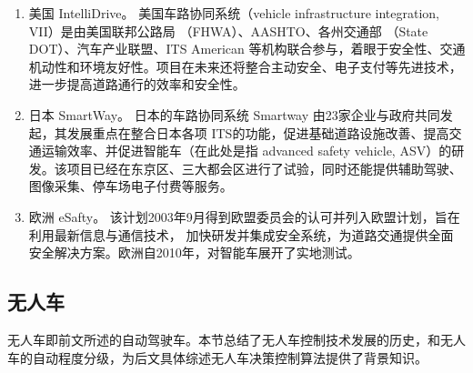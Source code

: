 \begin{enumerate}[wide=\parindent,label=(\arabic*)]
\item 美国  IntelliDrive。 美国车路协同系统（vehicle infrastructure integration, VII）是由美国联邦公路局 （FHWA）、AASHTO、各州交通部 （State DOT）、汽车产业联盟、ITS American 等机构联合参与，着眼于安全性、交通机动性和环境友好性。项目在未来还将整合主动安全、电子支付等先进技术，进一步提高道路通行的效率和安全性。

\item 日本  SmartWay。 日本的车路协同系统 Smartway \cite{Hiroshi2005Smartway} 由23家企业与政府共同发起，其发展重点在整合日本各项 ITS的功能，促进基础道路设施改善、提高交通运输效率、并促进智能车（在此处是指 advanced safety vehicle, ASV）\cite{Chapman2010USING}的研发。该项目已经在东京区、三大都会区进行了试验，同时还能提供辅助驾驶、图像采集、停车场电子付费等服务。

\item 欧洲  eSafty。 该计划2003年9月得到欧盟委员会的认可并列入欧盟计划，旨在利用最新信息与通信技术，
加快研发并集成安全系统，为道路交通提供全面安全解决方案。欧洲自2010年，对智能车展开了实地测试。
\end{enumerate}

\subsection{无人车}
\label{sec:self}

无人车即前文所述的自动驾驶车。本节总结了无人车控制技术发展的历史，和无人车的自动程度分级，为后文具体综述无人车决策控制算法提供了背景知识。


